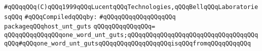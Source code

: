 \label{src/lib/std/src/bind-sysword-32.pkg}
\verb|#qQQqqQQq(C)qQQq1999qQQqLucentqQQqTechnologies,qQQqBellqQQqLaboratoriesqQQq|\newline
\newline
\verb|#qQQqCompiledqQQqby:|\newline
\verb|#qQQqqQQqqQQqqQQqqQQq|\newline
\newline
\verb|packageqQQqhost_unt_guts|\newline
\verb|qQQqqQQqqQQqqQQq=|\newline
\verb|qQQqqQQqqQQqqQQqone_word_unt_guts;qQQqqQQqqQQqqQQqqQQqqQQqqQQqqQQqqQQqqQQq#qQQqone_word_unt_gutsqQQqqQQqqQQqqQQqqQQqisqQQqfromqQQqqQQqqQQq|\newline
\newline

